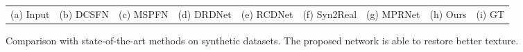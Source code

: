 \documentclass[letterpaper]{article} %
\begin{document}
\begin{figure}[!t]
\begin{center}
\begin{tabular}{ccccccccc}
(a) Input  &\hspace{-4mm} (b) DCSFN&\hspace{-4mm} (c) MSPFN&\hspace{-4mm} (d) DRDNet&\hspace{-4mm} (e) RCDNet &\hspace{-4mm}(f) Syn2Real&\hspace{-4mm} (g) MPRNet&\hspace{-4mm}(h) Ours &\hspace{-4mm}(i) GT
\\
\end{tabular}
\end{center}
\caption{Comparison with state-of-the-art methods on synthetic datasets.
The proposed network is able to restore better texture.
}
\label{fig:deraining-syn-example}
\end{figure}
%
%
%
%
%
\end{document}
